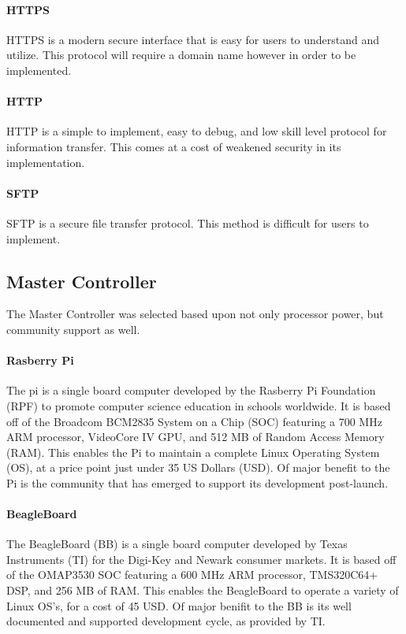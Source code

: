 \paragraph{HTTPS} 
HTTPS is a modern secure interface that is easy for users to understand and utilize.
This protocol will require a domain name however in order to be implemented.

\paragraph{HTTP}
HTTP is a simple to implement, easy to debug, and low skill level protocol for information transfer.
This comes at a cost of weakened security in its implementation.

\paragraph{SFTP}
SFTP is a secure file transfer protocol.
This method is difficult for users to implement.

\subsection{Master Controller}
The Master Controller  was selected based upon not only processor power, but community support as well. 

\paragraph{Rasberry Pi}
The \gls{pi} is a single board computer developed by the Rasberry Pi Foundation (RPF) to promote computer science education in schools worldwide.
It is based off of the Broadcom BCM2835 System on a Chip (SOC) featuring a 700 MHz ARM processor, VideoCore IV GPU, and 512 MB of Random Access Memory (RAM).
This enables the Pi to maintain a complete Linux Operating System (OS), at a price point just under 35 US Dollars (USD).
Of major benefit to the Pi is the community that has emerged to support its development post-launch.

\paragraph{BeagleBoard}
The BeagleBoard (BB) is a single board computer developed by Texas Instruments (TI) for the Digi-Key and Newark consumer markets.
It is based off of the OMAP3530 SOC featuring a 600 MHz ARM processor, TMS320C64+ DSP, and 256 MB of RAM.
This enables the BeagleBoard to operate a variety of Linux OS’s, for a cost of 45 USD.
Of major beniﬁt to the BB is its well documented and supported development cycle, as provided by TI.

